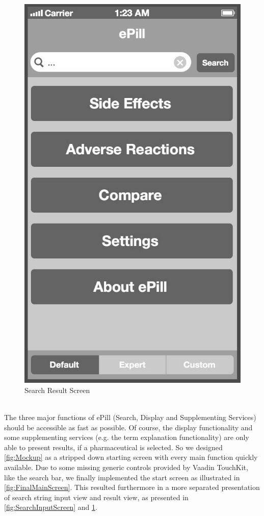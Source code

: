 \begin{figure}[!ptbh]
\begin{minipage}[b]{0.45\linewidth}
        \includegraphics[width=0.8025\linewidth]{figures/Screen_1_bw.jpg}
        \caption[Search Result Screen]{Search Result Screen}
        \label{fig:SearchResultScreen}
    \end{minipage}
\end{figure}
\\
The three major functions of ePill (Search, Display and Supplementing Services) should be accessible as fast as possible. Of course, the display functionality and some supplementing services (e.g. the term explanation functionality) are only able to present results, if a pharmaceutical is selected. So we designed \ref{fig:Mockup} as a stripped down starting screen with every main function quickly available. Due to some missing generic controls provided by Vaadin TouchKit, like the search bar, we finally implemented the start screen as illustrated in \ref{fig:FinalMainScreen}. This resulted furthermore in a more separated presentation of search string input view and result view, as presented in \ref{fig:SearchInputScreen} and \ref{fig:SearchResultScreen}.
